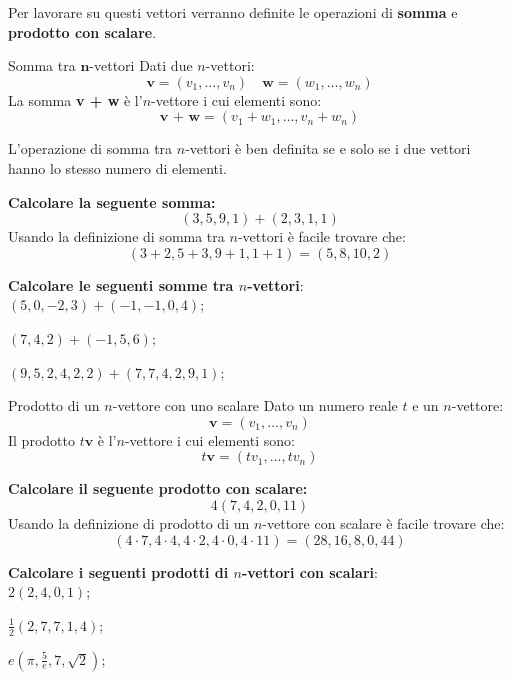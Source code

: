 Per lavorare su questi vettori verranno definite le operazioni di \textbf{somma} e \textbf{prodotto con scalare}.
\begin{newdef}{Somma tra $\bm{n}$-vettori}
    Dati due $n$-vettori:
    \[
        \textbf{v} = (v_1,\dots,v_n) \quad \textbf{w} = (w_1,\dots,w_n)
    \]
    La somma \textbf{v + w} è l'$n$-vettore i cui elementi sono:
    \[
        \textbf{v + w} = (v_1 + w_1, \dots, v_n + w_n)
    \]
\end{newdef}
\begin{nb}
    L'operazione di somma tra $n$-vettori è ben definita se e solo se i due vettori hanno lo stesso numero di elementi.
\end{nb}
\begin{esempio}
    \textbf{Calcolare la seguente somma:}
    \[
        (3, 5, 9, 1) + (2, 3, 1, 1)
    \]
    Usando la definizione di somma tra $n$-vettori è facile trovare che:
    \[
        (3 + 2, 5 + 3, 9 + 1, 1 + 1) = (5, 8, 10, 2)
    \]
\end{esempio}
\begin{exer}
    \textbf{Calcolare le seguenti somme tra $n$-vettori}:\\
    $(5,0,-2,3) + (-1, -1, 0, 4)$;

    $(7, 4, 2) + (-1, 5, 6)$;

    $(9, 5, 2, 4, 2, 2) + (7, 7, 4, 2, 9, 1)$;
\end{exer}
\begin{newdef}{Prodotto di un $n$-vettore con uno scalare}
    Dato un numero reale $t$ e un $n$-vettore:
    \[
        \textbf{v} = (v_1, \dots, v_n)
    \]
    Il prodotto $t\textbf{v}$ è l'$n$-vettore i cui elementi sono:
    \[
        t\textbf{v} = (tv_1, \dots, tv_n)
    \]
\end{newdef}
\begin{esempio}
    \textbf{Calcolare il seguente prodotto con scalare:}
    \[
        4(7, 4, 2, 0, 11)
    \]
    Usando la definizione di prodotto di un $n$-vettore con scalare è facile trovare che:
    \[
        (4 \cdot 7, 4 \cdot 4, 4 \cdot 2, 4 \cdot 0, 4 \cdot 11) = (28, 16, 8, 0, 44)
    \]
\end{esempio}
\begin{exer}
    \textbf{Calcolare i seguenti prodotti di $n$-vettori con scalari}:\\
    $2(2, 4, 0, 1)$;

    $\frac{1}{2}(2, 7, 7, 1, 4)$;

    $e(\pi, \frac{5}{e}, 7, \sqrt{2})$;
\end{exer}
